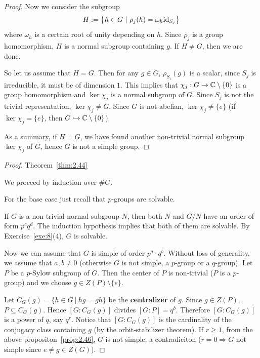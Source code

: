 \documentclass[twoside = false,	%
		headsepline,		%
		parskip = true,
		]{scrbook}						%
\begin{document}
\begin{proof}
        Now we consider the subgroup
        \begin{equation*}
            H:= \left\{ h \in G \ | \ \rho_j(h) = \omega_h \mathrm{id}_{S_j}\right\}
        \end{equation*}
        where $\omega_h$ is a certain root of unity depending on $h$. Since $\rho_j$ is a group homomorphism,
        $H$ is a normal subgroup containing $g$. If $H \neq G$, then we are done.

        So let us assume that $H=G$. Then for any $g \in G$, $\rho_{S_i}(g)$ is a scalar, since $S_j$ is irreducible, it must be of dimension $1$.
        This implies that $\chi_j: G \to \mathbb C \setminus \{0\}$ is a group homomorphism and $\ker \chi_j$ is a normal subgroup of $G$. Since $S_j$ is not the trivial representation, $\ker \chi_j \neq G$.
        Since $G$ is not abelian, $\ker \chi_j \neq \{e\}$ (if $\ker \chi_j = \{e\}$, then $G \hookrightarrow \mathbb C \setminus\{0\}$).

        As a summary, if $H=G$, we have found another non-trivial normal subgroup $\ker \chi_j$ of $G$, hence $G$ is not a simple group.
    \end{proof}

    \begin{proof} Theorem~\ref{thm:2.44}

        We proceed by induction over $\#G$.

        For the base case just recall that $p$-groups are solvable.

        If $G$ is a non-trivial normal subgroup $N$, then both $N$ and $G/N$ have an order of form $p^c q^d$. The induction hypothesis implies that both of them are solvable.
        By Exercise~\ref{exe:8}(4), $G$ is solvable.

        Now we can assume that $G$ is simple of order $p^a\cdot q^b$. Without loss of generality, we assume that $a,b \neq 0$ (otherwise $G$ is not simple, a $p$-group or a $q$-group).
        Let $P$ be a $p$-Sylow subgroup of $G$. Then the center of $P$ is non-trivial ($P$ is a $p$-group) and we choose $g \in Z(P) \setminus\{e\}$.

        Let $C_G(g) = \{h \in G \ | \ hg = gh\}$ be the \textbf{centralizer} of $g$. Since $g \in Z(P)$, $P \subseteq C_G(g)$.
        Hence $[G:C_G(g)]$ divides $[G:P] = q^b$. Therefore $[G:C_G(g)]$ is a power of $q$, say $q^r$. Notice that $[G:C_G(g)]$ is the cardinality of the conjugacy class containing $g$ (by the orbit-stabilizer theorem).
        If $r \geq 1$, from the above propositon~\ref{prop:2.46}, $G$ is not simple, a contradiciton ($r=0 \Rightarrow G$ not simple since $e \neq g \in Z(G)$).
    \end{proof}
\end{document}
